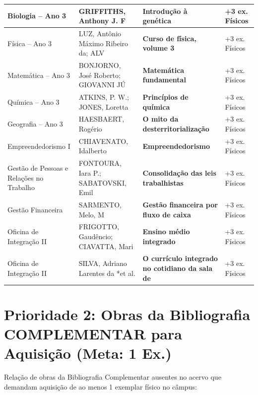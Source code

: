 \documentclass[10pt,a4paper]{article}
\begin{document}
\begin{xltabular}{\linewidth}{|p{3.8cm}|p{3.2cm}|X|p{2.2cm}|}
Biologia -- Ano 3 & GRIFFITHS, Anthony J. F & \textbf{Introdução à genética} & +3 ex. Físicos \\ \hline
Física -- Ano 3 & LUZ, Antônio Máximo Ribeiro da; ALV & \textbf{Curso de física, volume 3} & +3 ex. Físicos \\ \hline
Matemática -- Ano 3 & BONJORNO, José Roberto; GIOVANNI JÚ & \textbf{Matemática fundamental} & +3 ex. Físicos \\ \hline
Química -- Ano 3 & ATKINS, P. W.; JONES, Loretta & \textbf{Princípios de química} & +3 ex. Físicos \\ \hline
Geografia -- Ano 3 & HAESBAERT, Rogério & \textbf{O mito da desterritorialização} & +3 ex. Físicos \\ \hline
Empreendedorismo I & CHIAVENATO, Idalberto & \textbf{Empreendedorismo} & +3 ex. Físicos \\ \hline
Gestão de Pessoas e Relações no Trabalho & FONTOURA, Iara P.; SABATOVSKI, Emil & \textbf{Consolidação das leis trabalhistas} & +3 ex. Físicos \\ \hline
Gestão Financeira & SARMENTO, Melo, M & \textbf{Gestão financeira por fluxo de caixa} & +3 ex. Físicos \\ \hline
Oficina de Integração II & FRIGOTTO, Gaudêncio; CIAVATTA, Mari & \textbf{Ensino médio integrado} & +3 ex. Físicos \\ \hline
Oficina de Integração II & SILVA, Adriano Larentes da  *et al. & \textbf{O currículo integrado no cotidiano da sala de} & +3 ex. Físicos \\ \hline
\end{xltabular}

\newpage
\section{Prioridade 2: Obras da Bibliografia COMPLEMENTAR para Aquisição (Meta: 1 Ex.)}
Relação de obras da Bibliografia Complementar ausentes no acervo que demandam aquisição de ao menos 1 exemplar físico no câmpus:
\end{document}
